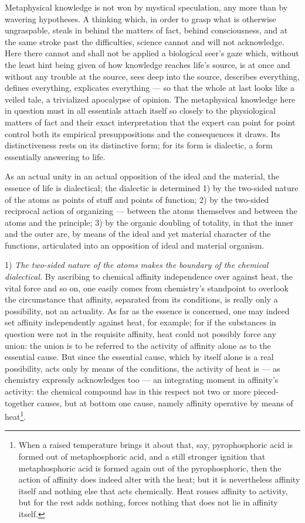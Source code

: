 \documentclass[12pt,a4paper]{book}
\begin{document}
Metaphysical knowledge is not won by mystical speculation, any more than by
wavering hypotheses. A thinking which, in order to grasp what is otherwise
ungraspable, steals in behind the matters of fact, behind consciousness, and at
the same stroke past the difficulties, science cannot and will not acknowledge.
Here there cannot and shall not be applied a biological seer's gaze which,
without the least hint being given of how knowledge reaches life's source, is
at once and without any trouble at the source, sees deep into the source,
describes everything, defines everything, explicates everything --- so that the
whole at last looks like a veiled tale, a trivialized apocalypse of opinion.
The metaphysical knowledge here in question must in all essentials attach
itself so closely to the physiological matters of fact and their exact
interpretation that the expert can point for point control both its empirical
presuppositions and the consequences it draws. Its distinctiveness rests on its
distinctive form; for its form is dialectic, a form essentially answering to
life.

As an actual unity in an actual opposition of the ideal and the material, the
essence of life is dialectical; the dialectic is determined 1) by the
two-sided nature of the atoms as points of stuff and points of function; 2) by
the two-sided reciprocal action of organizing --- between the atoms themselves
and between the atoms and the principle; 3) by the organic doubling of
totality, in that the inner and the outer are, by means of the ideal and yet
material character of the functions, articulated into an opposition of ideal
and material organism.

1) \emph{The two-sided nature of the atoms makes the boundary of the chemical
dialectical.} By ascribing to chemical affinity independence over against heat,
the vital force and so on, one easily comes from chemistry's standpoint to
overlook the circumstance that affinity, separated from its conditions, is
\setcounter{footnote}{0}
really only a possibility, not an actuality. As far as the essence is
concerned, one may indeed set affinity independently against heat, for example;
for if the substances in question were not in the requisite affinity, heat
could not possibly force any union: the union is to be referred to the activity
of affinity alone as to the essential cause. But since the essential cause,
which by itself alone is a real possibility, acts only by means of the
conditions, the activity of heat is --- as chemistry expressly acknowledges too
--- an integrating moment in affinity's activity: the chemical compound has in
this respect not two or more pieced-together causes, but at bottom one cause,
namely affinity operative by means of
heat\footnote{When a raised temperature brings it about that, say,
pyrophosphoric acid is formed out of metaphosphoric acid, and a still stronger
ignition that metaphosphoric acid is formed again out of the pyrophosphoric,
then the action of affinity does indeed alter with the heat; but it is
nevertheless affinity itself and nothing else that acts chemically. Heat rouses
affinity to activity, but for the rest adds nothing, forces nothing that does
not lie in affinity itself.}.
\end{document}
